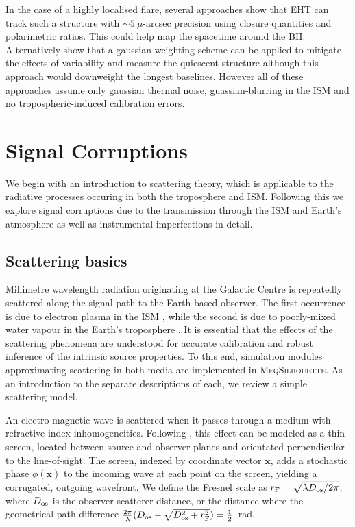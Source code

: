 In the case of a highly localised flare, several approaches \citep{Doeleman_2009, Fish_2009b, Johnson_2014} show that EHT can track such a structure with $\sim 5\ \mu$-arcsec precision using closure quantities and polarimetric ratios. This could help map the spacetime around the BH. Alternatively \citet{Lu_2016} show that a gaussian weighting scheme can be applied to mitigate the effects of variability and measure the quiescent structure although this approach would downweight the longest baselines. However all of these approaches assume only gaussian thermal noise, guassian-blurring in the ISM and no tropospheric-induced calibration errors.

\section{Signal Corruptions}
We begin with an introduction to scattering theory, which is applicable to the radiative processes occuring in both the troposphere and ISM. Following this we explore signal corruptions due to the transmission through the ISM and Earth's atmosphere as well as instrumental imperfections in detail. 

\subsection{Scattering basics}\label{sec:basic_scat}

Millimetre wavelength radiation originating at the Galactic Centre is repeatedly scattered along the signal path to the Earth-based observer. The first occurrence is due to electron plasma in the ISM \citep[e.g.][]{Bower_2006,Gwinn_2014}, while the second is due to poorly-mixed water vapour in the Earth's troposphere \citep*[e.g.][]{Carilli_1999, Lay_1997}. It is essential that the effects of the scattering phenomena are understood for accurate calibration and robust inference of the intrinsic source properties.  To this end, simulation modules approximating scattering in both media are implemented in \textsc{MeqSilhouette}. As an introduction to the separate descriptions of each, we review a simple scattering model.

An electro-magnetic wave is scattered when it passes through a medium with refractive index inhomogeneities. Following \citet{Narayan_1992}, this effect can be modeled as a thin screen, located between source and observer planes and orientated perpendicular to the line-of-sight. The screen, indexed by coordinate vector $\mathbf{x}$, adds a stochastic phase $\phi(\mathbf{x})$ to the incoming wave at each point on the screen, yielding a corrugated, outgoing wavefront. We define the Fresnel scale as  $r_{\rm F} = \sqrt{\lambda D_{\rm os}/2\pi}$, where $D_{\rm os}$ is the observer-scatterer distance, or the distance where the geometrical path difference $\frac{2\pi}{\lambda} (D_{\rm os} - \sqrt{D_{\rm os}^2 + r_{\rm F}^2}) =\frac{1}{2}$~rad.

